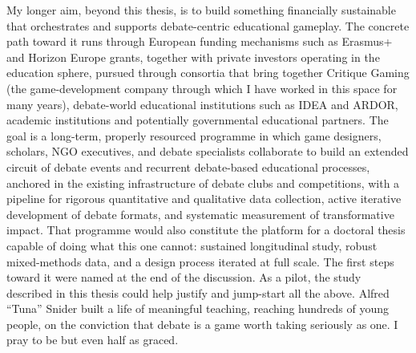 My longer aim, beyond this thesis, is to build something financially sustainable that orchestrates and supports debate-centric educational gameplay. The concrete path toward it runs through European funding mechanisms such as Erasmus+ and Horizon Europe grants, together with private investors operating in the education sphere, pursued through consortia that bring together Critique Gaming (the game-development company through which I have worked in this space for many years), debate-world educational institutions such as IDEA and ARDOR, academic institutions and potentially governmental educational partners. The goal is a long-term, properly resourced programme in which game designers, scholars, NGO executives, and debate specialists collaborate to build an extended circuit of debate events and recurrent debate-based educational processes, anchored in the existing infrastructure of debate clubs and competitions, with a pipeline for rigorous quantitative and qualitative data collection, active iterative development of debate formats, and systematic measurement of transformative impact. That programme would also constitute the platform for a doctoral thesis capable of doing what this one cannot: sustained longitudinal study, robust mixed-methods data, and a design process iterated at full scale. The first steps toward it were named at the end of the discussion. As a pilot, the study described in this thesis could help justify and jump-start all the above. Alfred ``Tuna'' Snider built a life of meaningful teaching, reaching hundreds of young people, on the conviction that debate is a game worth taking seriously as one. I pray to be but even half as graced. 